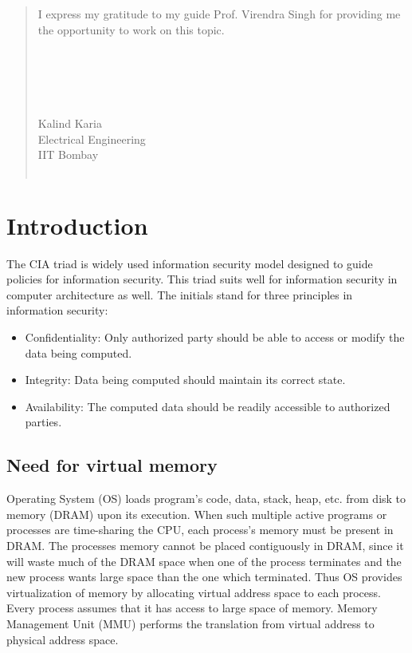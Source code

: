 \documentclass[a4paper,12pt, final]{report}
\begin{document}
\renewcommand{\abstractname}{Acknowledgement}
\begin{abstract}
    I express my gratitude to my guide Prof. Virendra Singh for providing me the opportunity to work on this topic. 
    \\\\
    \\\\
    \\\\
    Kalind Karia\\
    Electrical Engineering\\
    IIT Bombay\\\
\end{abstract}


\clearpage 

\tableofcontents
    \listoffigures

\chapter{Introduction}
The CIA triad is widely used information security model designed to guide policies for information security. This triad suits well for information security in computer architecture as well. The initials stand for three principles in information security:
\begin{itemize}
    \item Confidentiality: Only authorized party should be able to access or modify the data being computed.
    \item Integrity: Data being computed should maintain its correct state.
    \item Availability: The computed data should be readily accessible to authorized parties.
\end{itemize}

\section{Need for virtual memory}
Operating System (OS) loads program's code, data, stack, heap, etc. from disk to memory (DRAM) upon its execution. When such multiple active programs or processes are time-sharing the CPU, each process's memory must be present in DRAM. The processes memory cannot be placed contiguously in DRAM, since it will waste much of the DRAM space when one of the process terminates and the new process wants large space than the one which terminated. Thus OS provides virtualization of memory by allocating virtual address space to each process. Every process assumes that it has access to large space of memory. Memory Management Unit (MMU) performs the translation from virtual address to physical address space.
\end{document}
